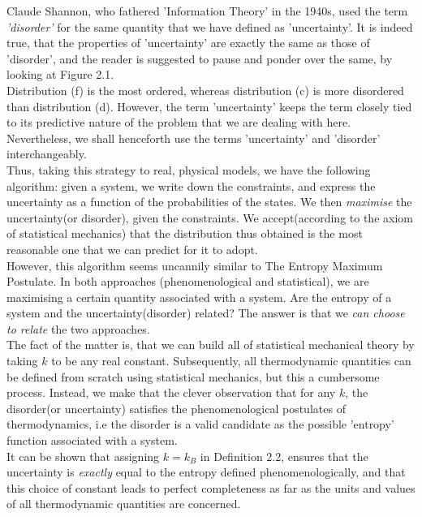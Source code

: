 \documentclass[oneside]{book}
\begin{document}
Claude Shannon, who fathered 'Information Theory' in the 1940s, used the term \emph{'disorder'} for the same quantity that we have defined as 'uncertainty'. It is indeed true, that the properties of 'uncertainty' are exactly the same as those of 'disorder', and the reader is suggested to pause and ponder over the same, by looking at Figure 2.1.\\

Distribution (f) is the most ordered, whereas distribution (c) is more disordered than distribution (d). However, the term 'uncertainty' keeps the term closely tied to its predictive nature of the problem that we are dealing with here. Nevertheless, we shall henceforth use the terms 'uncertainty' and 'disorder' interchangeably.\\

Thus, taking this strategy to real, physical models, we have the following algorithm: given a system, we write down the constraints, and express the uncertainty as a function of the probabilities of the states. We then \emph{maximise} the uncertainty(or disorder), given the constraints. We accept(according to the axiom of statistical mechanics) that the distribution thus obtained is the most reasonable one that we can predict for it to adopt.\\

However, this algorithm seems uncannily similar to The Entropy Maximum Postulate. In both approaches (phenomenological and statistical), we are maximising a certain quantity associated with a system. Are the entropy of a system and the uncertainty(disorder) related? The answer is that we \emph{can choose to relate} the two approaches. \\

The fact of the matter is, that we can build all of statistical mechanical theory by taking $k$ to be any real constant. Subsequently, all thermodynamic quantities can be defined from scratch using statistical mechanics, but this a cumbersome process. Instead, we make that the clever observation that for any $k$, the disorder(or uncertainty) satisfies the phenomenological postulates of thermodynamics, i.e the disorder is a valid candidate as the possible 'entropy' function associated with a system.\\

It can be shown that assigning $k = k_B$ in Definition 2.2, ensures that the uncertainty is \emph{exactly} equal to the entropy defined phenomenologically, and that this choice of constant leads to perfect completeness as far as the units and values of all thermodynamic quantities are concerned.
\\
\end{document}
